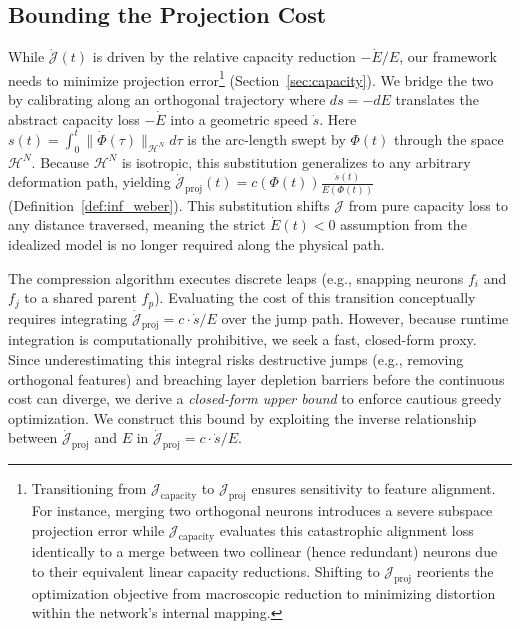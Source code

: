 \documentclass[11pt, a4paper, copyright, gdm]{google}
\newcommand{\normshort}[1]{\lVert#1\rVert}
\newcommand{\calH}{\mathcal{H}}
\newcommand{\calJ}{\mathcal{J}}
\theoremstyle{definition}
\begin{document}
\subsection{Bounding the Projection Cost}
\label{sec:bound_proj_cost}
While $\dot{\calJ}(t)$ is driven by the relative capacity reduction $-\dot{E}/E$, our framework needs to minimize projection error\footnote{Transitioning from $\calJ_{\text{capacity}}$ to $\calJ_{\text{proj}}$ ensures sensitivity to feature alignment. For instance, merging two orthogonal neurons introduces a severe subspace projection error while $\calJ_{\text{capacity}}$ evaluates this catastrophic alignment loss identically to a merge between two collinear (hence redundant) neurons due to their equivalent linear capacity reductions. Shifting to $\calJ_{\text{proj}}$ reorients the optimization objective from macroscopic reduction to minimizing distortion within the network's internal mapping.} (Section~\ref{sec:capacity}). We bridge the two by calibrating along an orthogonal trajectory where $ds = -dE$ translates the abstract capacity loss $-\dot{E}$ into a geometric speed $\dot{s}$. Here $s(t) = \int_{0}^{t} \normshort{\dot{\Phi}(\tau)}_{\calH^N} d\tau$ is the arc-length swept by $\Phi(t)$ through the space $\calH^N$. Because $\calH^N$ is isotropic, this substitution generalizes to any arbitrary deformation path, yielding $\dot{\calJ}_{\text{proj}}(t) = c(\Phi(t)) \frac{\dot{s}(t)}{E(\Phi(t))}$ (Definition~\ref{def:inf_weber}). This substitution shifts $\calJ$ from pure capacity loss to any distance traversed, meaning the strict $\dot{E}(t) < 0$ assumption from the idealized model is no longer required along the physical path.

The compression algorithm executes discrete leaps (e.g., snapping neurons $f_i$ and $f_j$ to a shared parent $f_p$). Evaluating the cost of this transition conceptually requires integrating $\dot{\calJ}_{\text{proj}} = c \cdot \dot{s} / E$ over the jump path. However, because runtime integration is computationally prohibitive, we seek a fast, closed-form proxy. Since underestimating this integral risks destructive jumps (e.g., removing orthogonal features) and breaching layer depletion barriers before the continuous cost can diverge, we derive a \textit{closed-form upper bound} to enforce cautious greedy optimization. We construct this bound by exploiting the inverse relationship between $\dot{\calJ}_{\text{proj}}$ and $E$ in $\dot{\calJ}_{\text{proj}} = c \cdot \dot{s} / E$.
\end{document}
